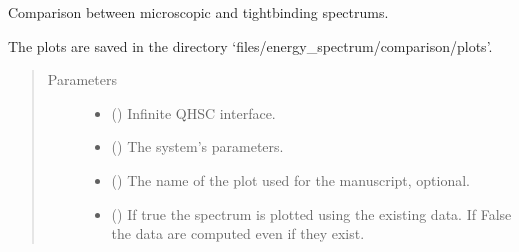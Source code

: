 \documentclass[letterpaper,10pt,english]{sphinxmanual}
\begin{document}
\begin{fulllineitems}
\label{\detokenize{modules:modules.utils.plot_spectrum_comparison}}
\pysigstartsignatures
{}
\pysigstopsignatures
\sphinxAtStartPar
Comparison between microscopic and tight\sphinxhyphen{}binding spectrums.

\sphinxAtStartPar
The plots are saved in the directory ‘files/energy\_spectrum/comparison/plots’.
\begin{quote}\begin{description}
\item[{Parameters}] \leavevmode\begin{itemize}
\item {} 
\sphinxAtStartPar
{} () \textendash{} Infinite QH\sphinxhyphen{}SC interface.

\item {} 
\sphinxAtStartPar
{} () \textendash{} The system’s parameters.

\item {} 
\sphinxAtStartPar
{} () \textendash{} The name of the plot used for the manuscript, optional.

\item {} 
\sphinxAtStartPar
{} () \textendash{} If true the spectrum is plotted using the existing data.
If False the data are computed even if they exist.

\end{itemize}

\end{description}\end{quote}

\end{fulllineitems}

\end{document}
